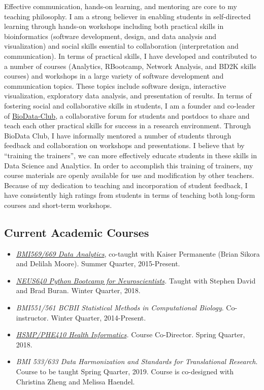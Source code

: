 \documentclass[11pt,]{article}
\providecommand{\tightlist}{%
  \setlength{\itemsep}{0pt}\setlength{\parskip}{0pt}}
\begin{document}
Effective communication, hands-on learning, and mentoring are core to my
teaching philosophy. I am a strong believer in enabling students in
self-directed learning through hands-on workshops including both
practical skills in bioinformatics (software development, design, and
data analysis and visualization) and social skills essential to
collaboration (interpretation and communication). In terms of practical
skills, I have developed and contributed to a number of courses
(Analytics, RBootcamp, Network Analysis, and BD2K skills courses) and
workshops in a large variety of software development and communication
topics. These topics include software design, interactive visualization,
exploratory data analysis, and presentation of results. In terms of
fostering social and collaborative skills in students, I am a founder
and co-leader of \href{https://biodata-club.github.io}{BioData-Club}, a
collaborative forum for students and postdocs to share and teach each
other practical skills for success in a research environment. Through
BioData Club, I have informally mentored a number of students through
feedback and collaboration on workshops and presentations. I believe
that by ``training the trainers'', we can more effectively educate
students in these skills in Data Science and Analytics. In order to
accomplish this training of trainers, my course materials are openly
available for use and modification by other teachers. Because of my
dedication to teaching and incorporation of student feedback, I have
consistently high ratings from students in terms of teaching both
long-form courses and short-term workshops.

\subsection{Current Academic Courses}\label{current-academic-courses}

\begin{itemize}
\tightlist
\item
  \emph{\href{https://github.com/laderast/AnalyticsCourse}{BMI569/669
  Data Analytics}}, co-taught with Kaiser Permanente (Brian Sikora and
  Delilah Moore). Summer Quarter, 2015-Present.
\item
  \emph{\href{https://github.com/dasaderi/python_neurobootcamp}{NEUS640
  Python Bootcamp for Neuroscientists}.} Taught with Stephen David and
  Brad Buran. Winter Quarter, 2018.
\item
  \emph{BMI551/561 BCBII Statistical Methods in Computational Biology}.
  Co-instructor. Winter Quarter, 2014-Present.
\item
  \emph{\href{http://laderast.github.io/HSMP410/}{HSMP/PHE410 Health
  Informatics}.} Course Co-Director. Spring Quarter, 2018.
\item
  \emph{BMI 533/633 Data Harmonization and Standards for Translational
  Research}. Course to be taught Spring Quarter, 2019. Course is
  co-designed with Christina Zheng and Melissa Haendel.
\end{itemize}
\end{document}
